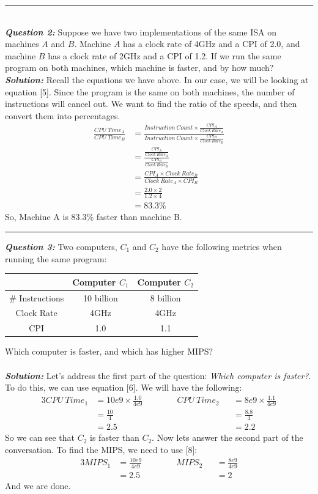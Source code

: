 \documentclass{article}
\begin{document}
\hrule
\noindent \\
\indent \textit{\textbf{Question 2:}} Suppose we have two implementations of the same ISA on machines $A$ and $B$. Machine $A$ has a clock rate of 4GHz and a CPI of 2.0, and machine $B$ has a clock rate of 2GHz and a CPI of 1.2. If we run the same program on both machines, which machine is faster, and by how much?\\
\noindent \textit{\textbf{Solution:}} Recall the equations we have above. In our case, we will be looking at equation [5]. Since the program is the same on both machines, the number of instructions will cancel out. We want to find the ratio of the speeds, and then convert them into percentages.
\begin{align*}
\frac{CPU\ Time_{A}}{CPU\ Time_{B}} &= \frac{
Instruction\ Count \times \frac{CPI_{A}}{Clock\ Rate_{A}}
}{
Instruction\ Count \times \frac{CPI_{B}}{Clock\ Rate_{B}}
}\\
&= \frac{
\frac{CPI_{A}}{Clock\ Rate_{A}}
}{
\frac{CPI_{B}}{Clock\ Rate_{B}}
}\\
&= \frac{CPI_{A}\times Clock\ Rate_{B}}{Clock\ Rate_{A}\times CPI_{B}}\\
&= \frac{2.0 \times 2}{1.2 \times 4}\\
&= 83.3\%
\end{align*}
\noindent So, Machine A is $83.3\%$ faster than machine B.\\
\hrule
\newpage


\indent \textit{\textbf{Question 3:}} Two computers, $C_{1}$ and $C_{2}$ have the following metrics when running the same program:
\begin{center}
\begin{tabular}{|c|c|c|}
\hline
& Computer $C_{1}$ & Computer $C_{2}$\\ \hline
\# Instructions & 10 billion & 8 billion\\ \hline
Clock Rate & 4GHz & 4GHz\\ \hline
CPI & 1.0 & 1.1\\ \hline
\end{tabular}
\end{center}
\noindent Which computer is faster, and which has higher MIPS?\\\\
\textit{\textbf{Solution:}} Let's address the first part of the question: \textit{Which computer is faster?}. To do this, we can use equation [6]. We will have the following:
\begin{alignat*}{3}
CPU\ Time_{1} &= 10e9 \times \frac{1.0}{4e9} \qquad\qquad CPU\ Time_{2} &&= 8e9 \times \frac{1.1}{4e9}\\
&= \frac{10}{4} &&= \frac{8.8}{4}\\
&= 2.5 &&= 2.2
\end{alignat*}
\noindent So we can see that $C_{2}$ is faster than $C_{2}$. Now lets answer the second part of the conversation. To find the MIPS, we need to use [8]:
\begin{alignat*}{3}
MIPS_{1} &= \frac{10e9}{4e9} \qquad\qquad MIPS_{2} &&= \frac{8e9}{4e9}\\
&= 2.5 &&= 2
\end{alignat*}
\noindent And we are done.\\
\end{document}
